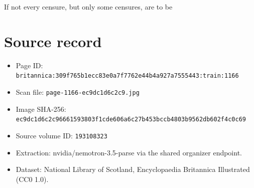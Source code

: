 \documentclass{article}
\begin{document}
If not every censure, but only some censures, are to be

\section*{Source record}
\begin{itemize}
\item Page ID: \texttt{britannica:309f765b1ecc83e0a7f7762e44b4a927a7555443:train:1166}
\item Scan file: \texttt{page-1166-ec9dc1d6c2c9.jpg}
\item Image SHA-256: \texttt{ec9dc1d6c2c96661593803f1cde606a6c27b453bccb4803b9562db602f4c0c69}
\item Source volume ID: \texttt{193108323}
\item Extraction: nvidia/nemotron-3.5-parse via the shared organizer endpoint.
\item Dataset: National Library of Scotland, Encyclopaedia Britannica Illustrated (CC0 1.0).
\end{itemize}
\end{document}
